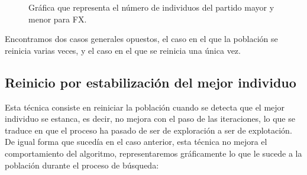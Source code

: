 \documentclass[11pt,a4paper]{article}
\begin{document}
\begin{figure}[!h]
\begin{minipage}[b]{0.4\textwidth}
				\caption{Gráfica que representa el número de individuos del partido mayor y menor para FX.}
			\end{minipage}
		\end{figure}
		
		\noindent Encontramos dos casos generales opuestos, el caso en el que la población se reinicia varias veces, y el caso en el que se reinicia una única vez.
	
	
\clearpage

	\subsection{Reinicio por estabilización del mejor individuo}
	
		\noindent Esta técnica consiste en reiniciar la población cuando se detecta que el mejor individuo se estanca, es decir, no mejora con el paso de las iteraciones, lo que se traduce en que el proceso ha pasado de ser de exploración a ser de explotación.\\
		
		\noindent De igual forma que sucedía en el caso anterior, esta técnica no mejora el comportamiento del algoritmo, representaremos gráficamente lo que le sucede a la población durante el proceso de búsqueda:
		
\end{document}

